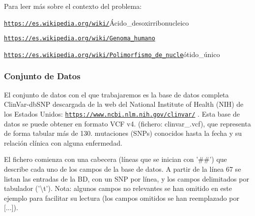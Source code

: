 Para leer más sobre el contexto del problema\-: \begin{DoxyItemize}
\item \href{https://es.wikipedia.org/wiki/}{\tt https\-://es.\-wikipedia.\-org/wiki/}Ácido\-\_\-desoxirribonucleico \item \href{https://es.wikipedia.org/wiki/Genoma_humano}{\tt https\-://es.\-wikipedia.\-org/wiki/\-Genoma\-\_\-humano} \item \href{https://es.wikipedia.org/wiki/Polimorfismo_de_nucle}{\tt https\-://es.\-wikipedia.\-org/wiki/\-Polimorfismo\-\_\-de\-\_\-nucle}ótido\-\_\-único\end{DoxyItemize}
\hypertarget{index_baseDatos}{}\subsubsection{Conjunto de Datos}\label{index_baseDatos}
El conjunto de datos con el que trabajaremos es la base de datos completa Clin\-Var-\/db\-S\-N\-P descargada de la web del National Institute of Health (N\-I\-H) de los Estados Unidos\-: \href{https://www.ncbi.nlm.nih.gov/clinvar/}{\tt https\-://www.\-ncbi.\-nlm.\-nih.\-gov/clinvar/} . Esta base de datos se puede obtener en formato V\-C\-F v4. (fichero\-: clinvar\-\_.\-vcf), que representa de forma tabular más de 130. mutaciones (S\-N\-Ps) conocidos hasta la fecha y su relación clínica con alguna enfermedad.

El fichero comienza con una cabecera (líneas que se inician con '\#\#') que describe cada uno de los campos de la base de datos. A partir de la línea 67 se listan las entradas de la B\-D, con un S\-N\-P por línea, y los campos delimitados por tabulador ('\textbackslash{}t'). Nota\-: algunos campos no relevantes se han omitido en este ejemplo para facilitar su lectura (los campos omitidos se han reemplazado por \mbox{[}...\mbox{]}).


